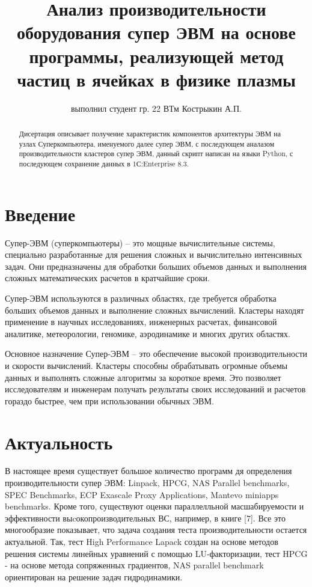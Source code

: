 \documentclass{article}
\title{Анализ производительности оборудования супер ЭВМ на основе программы, реализующей метод частиц в ячейках в физике плазмы}
\author{выполнил студент гр. 22 ВТм Кострыкин А.П.}
\begin{document}
\maketitle

\begin{abstract}
Дисертация описывает получение характеристик компонентов архитектуры ЭВМ на узлах Суперкомпьютера, именуемого далее супер ЭВМ, с последующем аналазом производительности кластеров супер ЭВМ, данный скрипт написан на языки Python, с последующем сохранение данных в 1С:Enterprise 8.3.
\end{abstract}

\section{Введение}
Супер-ЭВМ (суперкомпьютеры) – это мощные вычислительные системы, специально разработанные для решения сложных и вычислительно интенсивных задач. Они предназначены для обработки больших объемов данных и выполнения сложных математических расчетов в кратчайшие сроки.

Супер-ЭВМ используются в различных областях, где требуется обработка больших объемов данных и выполнение сложных вычислений. Кластеры находят применение в научных исследованиях, инженерных расчетах, финансовой аналитике, метеорологии, геномике, аэродинамике и многих других областях.

Основное назначение Супер-ЭВМ – это обеспечение высокой производительности и скорости вычислений. Кластеры способны обрабатывать огромные объемы данных и выполнять сложные алгоритмы за короткое время. Это позволяет исследователям и инженерам получать результаты своих исследований и расчетов гораздо быстрее, чем при использовании обычных ЭВМ.

\section{Актуальность}

В настоящее время существует большое количество программ дя определения производительности супер ЭВМ: Linpack, HPCG, NAS Parallel benchmarks, SPEC Benchmarks, ECP Exascale Proxy Applications, Mantevo miniapps benchmarks. Кроме того, существуют оценки параллелльной масшабируемости и эффективности выcокопроизводительных ВС, например, в книге [7]. Все это многообразие показывает, что задача создания теста производительности остается актуальной. Так, тест High Performance Lapack создан на основе методов решения системы линейных уравнений с помощью LU-факторизации, тест HPCG - на основе метода сопряженных градиентов, NAS parallel benchmark ориентирован на решение задач гидродинамики.
\end{document}
